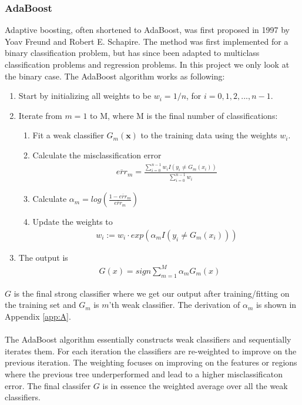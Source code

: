 \documentclass[a4paper,twocolumn]{article}
\begin{document}
\subsubsection{AdaBoost}
Adaptive boosting, often shortened to AdaBoost, was first proposed in 1997 by Yoav Freund and Robert E. Schapire\cite{adaboost}. The method was first implemented for a binary classification problem, but has since been adapted to multiclass classification problems and regression problems. In this project we only look at the binary case. The AdaBoost algorithm works as following:
\begin{enumerate}
    \item Start by initializing all weights to be $w_{i} = 1/n$, for $i = 0,1,2,...,n-1$.
    \item Iterate from $m=1$ to M, where M is the final number of classifications:
    \begin{enumerate}[label=(\alph*)]
        \item Fit a weak classifier $G_{m}(\mathbf{x})$ to the training data using the weights $w_{i}$.
        \item Calculate the misclassification error
        \begin{align}
            \overline{err}_{m} =\frac{\sum_{i=0}^{n-1}w_{i}I(y_{i} \neq G_{m}(x_{i}))}{\sum_{i=0}^{n-1}w_{i}}
        \end{align}
        \item Calculate $\alpha_{m} = log\left(\frac{1- \overline{err}_{m}}{\overline{err}_{m}}\right)$ 
        \item Update the weights to
        \begin{align}
            w_{i} := w_{i}\cdot exp(\alpha_{m}I(y_{i} \neq G_{m}(x_{i})))
        \end{align}
    \end{enumerate}
    \item The output is 
    \begin{align}
        G(x)=sign\sum_{m=1}^{M}\alpha_{m}G_{m}(x)
    \end{align}
\end{enumerate}
$G$ is the final strong classifier where we get our output after training/fitting on the training set and $G_{m}$ is $m$'th weak classifier. The derivation of $\alpha_{m}$ is shown in Appendix \ref{app:A}.\\
\\
The AdaBoost algorithm essentially constructs weak classifiers and sequentially iterates them. For each iteration the classifiers are re-weighted to improve on the previous iteration. The weighting focuses on improving on the features or regions where the previous tree underperformed and lead to a higher misclassificaton error. The final classifer $G$ is in essence the weighted average over all the weak classifiers.
\end{document}

